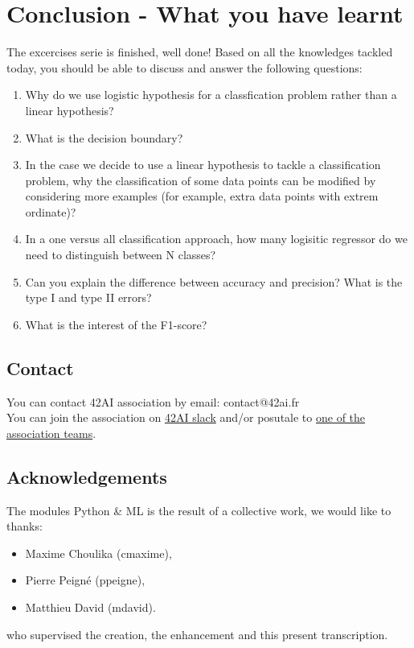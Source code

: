 \documentclass{42-en}
\begin{document}
\chapter{Conclusion - What you have learnt}

The excercises serie is finished, well done!
Based on all the knowledges tackled today, you should be able to discuss and answer the following questions:

\begin{enumerate}
  \item Why do we use logistic hypothesis for a classfication problem rather than a linear hypothesis?
  \item What is the decision boundary?
  \item In the case we decide to use a linear hypothesis to tackle a classification problem, why the classification of some data points can be modified by considering more examples (for example, extra data points with extrem ordinate)?
  \item In a one versus all classification approach, how many logisitic regressor do we need to distinguish between N classes?
  \item Can you explain the difference between accuracy and precision? What is the type I and type II errors?
  \item What is the interest of the F1-score?
\end{enumerate}


\newpage

\section*{Contact}
You can contact 42AI association by email: contact@42ai.fr\\
You can join the association on \href{https://join.slack.com/t/42-ai/shared_invite/zt-ebccw5r7-YPkDM6xOiYRPjqJXkrKgcA}{42AI slack}
and/or posutale to \href{https://forms.gle/VAFuREWaLmaqZw2D8}{one of the association teams}.

\section*{Acknowledgements}
The modules Python \& ML is the result of a collective work, we would like to thanks:
\begin{itemize}
  \item Maxime Choulika (cmaxime),
  \item Pierre Peigné (ppeigne),
  \item Matthieu David (mdavid).
\end{itemize}
who supervised the creation, the enhancement and this present transcription.
\end{document}
